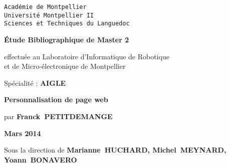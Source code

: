 \documentclass[10pt,a4paper]{article}
\begin{document}
\pagestyle{fancyplain}
\thispagestyle{empty}
\noindent
\begin{center}
\large{\texttt{Académie de Montpellier}}\\
\Large{\texttt{Université Montpellier II}}\\
\large{\texttt{Sciences et Techniques du Languedoc}}\\
\end{center}

\vspace{1cm}

\begin{center}
\Huge{\textbf{Étude Bibliographique de Master 2\\}}
 \vspace{1.0cm}
\normalsize
\begin{center}
\vspace{1.0cm}
effectuée au Laboratoire d'Informatique de Robotique\\
et de Micro-électronique de Montpellier
\end{center}

\vspace{2mm}

\vspace{0.1cm}
\normalsize

\vspace{3mm}

\large{Spécialité} : \textbf{AIGLE}\\
\vspace{1.0cm}

\LARGE{\textbf{Personnalisation de page web}}
\vspace{2mm}

\begin{center}
  par \textbf{Franck~PETITDEMANGE}
\end{center}

\vspace{2mm}



\vspace{4cm}

\textbf{Mars 2014}

\vspace{0.5cm}

Sous la direction de \textbf{Marianne~HUCHARD, Michel~MEYNARD, Yoann~BONAVERO}


\end{center}
\end{document}
